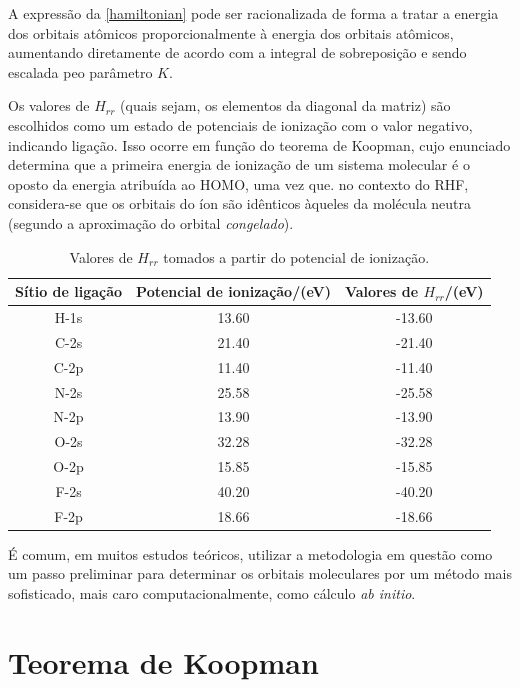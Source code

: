 A expressão da \autoref{hamiltonian} pode ser racionalizada de forma a tratar a energia dos orbitais atômicos proporcionalmente à energia dos orbitais atômicos, aumentando diretamente de acordo com a integral de sobreposição e sendo escalada peo parâmetro $K$.

 Os valores de $H_{rr}$ (quais sejam, os elementos da diagonal da matriz) são escolhidos como um estado de potenciais de ionização com o valor negativo, indicando ligação. Isso ocorre em função do teorema de Koopman\autocite{Koopmans1934}, cujo enunciado determina que a primeira energia de ionização de um sistema molecular é o oposto da energia atribuída ao \gls{HOMO}, uma vez que. no contexto do \gls{RHF}, considera-se que os orbitais do íon são idênticos àqueles da molécula neutra (segundo a aproximação do orbital \textit{congelado}). 

\begin{table}[htb]
	\centering
	\caption{\label{qua:Quadro_1} Valores de $H_{rr}$ tomados a partir do potencial de ionização.}	
	\begin{tabular}{ccc}
		\toprule
		\textbf{Sítio de ligação} & \textbf{Potencial de ionização/(eV)} & \textbf{Valores de $H_{rr}$/(eV)}
		\\ 
		\midrule
        H-1s & 13.60 & -13.60 \\
        C-2s & 21.40 & -21.40 \\
        C-2p & 11.40 & -11.40 \\
        N-2s & 25.58 & -25.58 \\
        N-2p & 13.90 & -13.90 \\
        O-2s & 32.28 & -32.28 \\
        O-2p & 15.85 & -15.85 \\
        F-2s & 40.20 & -40.20 \\
        F-2p & 18.66 & -18.66 \\
    \bottomrule
	\end{tabular}
\end{table}

É comum, em muitos estudos teóricos\autocite{Zubatiuk2021, BroJrgensen2021}, utilizar a metodologia em questão como um passo preliminar para determinar os orbitais moleculares por um método mais sofisticado, mais caro computacionalmente, como cálculo \textit{ab initio}.

\section{Teorema de Koopman}



